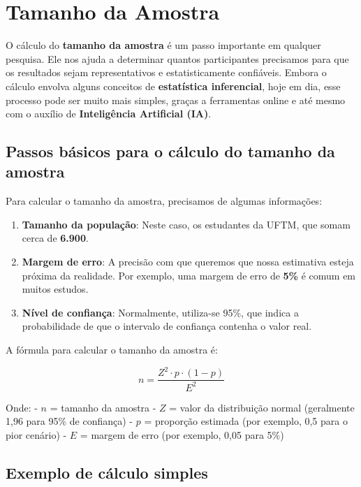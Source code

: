 \documentclass[
]{book}
\providecommand{\tightlist}{%
  \setlength{\itemsep}{0pt}\setlength{\parskip}{0pt}}
\begin{document}
\chapter{Tamanho da Amostra}\label{tamanho-da-amostra}

O cálculo do \textbf{tamanho da amostra} é um passo importante em qualquer pesquisa. Ele nos ajuda a determinar quantos participantes precisamos para que os resultados sejam representativos e estatisticamente confiáveis. Embora o cálculo envolva alguns conceitos de \textbf{estatística inferencial}, hoje em dia, esse processo pode ser muito mais simples, graças a ferramentas online e até mesmo com o auxílio de \textbf{Inteligência Artificial (IA)}.

\section{Passos básicos para o cálculo do tamanho da amostra}\label{passos-buxe1sicos-para-o-cuxe1lculo-do-tamanho-da-amostra}

Para calcular o tamanho da amostra, precisamos de algumas informações:

\begin{enumerate}
\def\labelenumi{\arabic{enumi}.}
\tightlist
\item
  \textbf{Tamanho da população}: Neste caso, os estudantes da UFTM, que somam cerca de \textbf{6.900}.
\item
  \textbf{Margem de erro}: A precisão com que queremos que nossa estimativa esteja próxima da realidade. Por exemplo, uma margem de erro de \textbf{5\%} é comum em muitos estudos.
\item
  \textbf{Nível de confiança}: Normalmente, utiliza-se 95\%, que indica a probabilidade de que o intervalo de confiança contenha o valor real.
\end{enumerate}

A fórmula para calcular o tamanho da amostra é:

\[
n = \frac{{Z^2 \cdot p \cdot (1 - p)}}{{E^2}}
\]

Onde:
- \(n\) = tamanho da amostra
- \(Z\) = valor da distribuição normal (geralmente 1,96 para 95\% de confiança)
- \(p\) = proporção estimada (por exemplo, 0,5 para o pior cenário)
- \(E\) = margem de erro (por exemplo, 0,05 para 5\%)

\section{Exemplo de cálculo simples}\label{exemplo-de-cuxe1lculo-simples}
\end{document}
